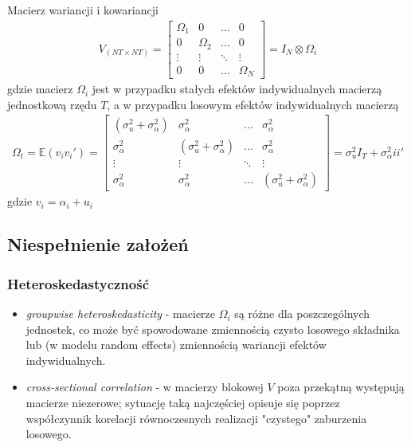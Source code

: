 Macierz wariancji i kowariancji
\begin{gather*}
V_{(NT\times NT)}=
\begin{bmatrix}
	\Omega _1 & 0         & \ldots & 0         \\
	0         & \Omega _2 & \ldots & 0         \\
	\vdots    & \vdots    & \ddots & \vdots    \\
	0         & 0         & \ldots & \Omega _N
\end{bmatrix}
=I_N\otimes \Omega_i
\end{gather*}
gdzie macierz $ \Omega_i $ jest w przypadku stałych efektów indywidualnych macierzą jednostkową rzędu $ T $, a w przypadku losowym efektów indywidualnych macierzą
\begin{gather*}
\Omega_t=\mathbb E (v_iv_i')=
\begin{bmatrix}
	(\sigma _{u}^2+\sigma_\alpha^2) & \sigma _{\alpha }^2             & \ldots & \sigma
 _{\alpha }^2            \\
	\sigma _{\alpha }^2             & (\sigma _{u}^2+\sigma_\alpha^2) & \ldots & \sigma
 _{\alpha }^2            \\
	\vdots                          & \vdots                          & \ddots & \vdots                          \\
	\sigma _{\alpha }^2             & \sigma _{\alpha }^2             & \ldots & (\sigma _{u}^2+\sigma_\alpha^2)
\end{bmatrix}
=\sigma_u^2I_T+\sigma_\alpha^2ii'
\end{gather*}
gdzie $ v_i=\alpha_i+u_i $
\subsection{Niespełnienie założeń}
\subsubsection{Heteroskedastyczność}
\begin{itemize}
\item \textit{groupwise heteroskedasticity} - macierze $ \Omega_i $ są różne dla poszczególnych jednostek, co może być spowodowane zmiennością czysto losowego składnika lub (w modelu random effects) zmiennością wariancji efektów indywidualnych.
\item \textit{cross-sectional correlation} - w macierzy blokowej $ V $ poza przekątną występują macierze niezerowe; sytuację taką najczęściej opisuje się poprzez współczynnik korelacji równoczesnych realizacji "czystego" zaburzenia losowego.
\end{itemize}

